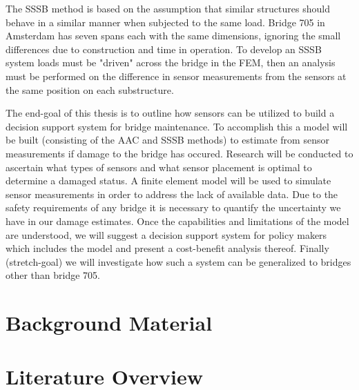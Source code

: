 \documentclass[11pt]{article}
\begin{document}
The SSSB method is based on the assumption that similar structures should
behave in a similar manner when subjected to the same load. Bridge 705 in
Amsterdam has seven spans each with the same dimensions, ignoring the small
differences due to construction and time in operation. To develop an SSSB
system loads must be "driven" across the bridge in the FEM, then an analysis
must be performed on the difference in sensor measurements from the sensors
at the same position on each substructure.

The end-goal of this thesis is to outline how sensors can be utilized to
build a decision support system for bridge maintenance. To accomplish this a
model will be built (consisting of the AAC and SSSB methods) to estimate from
sensor measurements if damage to the bridge has occured. Research will be
conducted to ascertain what types of sensors and what sensor placement is
optimal to determine a damaged status. A finite element model will be used to
simulate sensor measurements in order to address the lack of available data.
Due to the safety requirements of any bridge it is necessary to quantify the
uncertainty we have in our damage estimates. Once the capabilities and
limitations of the model are understood, we will suggest a decision support
system for policy makers which includes the model and present a cost-benefit
analysis thereof. Finally (stretch-goal) we will investigate how such a
system can be generalized to bridges other than bridge 705.
\section{Background Material}
\label{sec:org33155ba}
\section{Literature Overview}
\label{sec:org7d1dcc8}
\end{document}
